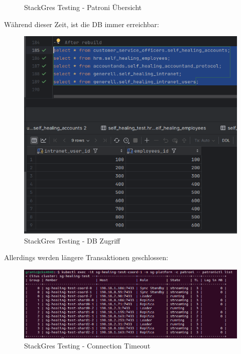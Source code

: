 \begin{flushleft}
\begin{figure}[H]
        \caption{StackGres Testing - Patroni Übersicht}
        \label{fig:stackgres_patroni_failover_overview}
    \end{figure}
    Während dieser Zeit, ist die DB immer erreichbar:
    \begin{figure}[H]
        \centering
        \includegraphics[width=0.75\linewidth]{source/appendix/evaluation_testing/stackgres_node_down_access_possible}
        \caption{StackGres Testing - DB Zugriff}
        \label{fig:stackgres_node_down_access_possible}
    \end{figure}
    Allerdings werden längere Transaktionen geschlossen:
    \begin{figure}[H]
        \centering
        \includegraphics[width=1\linewidth]{source/appendix/evaluation_testing/stackgres_citus_connection_timeout}
        \caption{StackGres Testing - Connection Timeout}
        \label{fig:stackgres_citus_connection_timeout}
    \end{figure}
\end{flushleft}